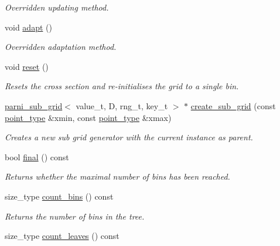 \begin{DoxyCompactItemize}
\begin{DoxyCompactList}\small\item\em Overridden updating method. \end{DoxyCompactList}\item 
\hypertarget{a00395_a569621866d7d53e00a1586d12d7200c8}{}void \hyperlink{a00395_a569621866d7d53e00a1586d12d7200c8}{adapt} ()\label{a00395_a569621866d7d53e00a1586d12d7200c8}

\begin{DoxyCompactList}\small\item\em Overridden adaptation method. \end{DoxyCompactList}\item 
void \hyperlink{a00395_a1ba9757b4e125032dd1dc836fec4c4fb}{reset} ()
\begin{DoxyCompactList}\small\item\em Resets the cross section and re-\/initialises the grid to a single bin. \end{DoxyCompactList}\item 
\hypertarget{a00395_af614bf3d946c45465e2d70e2ece2b8e0}{}\hyperlink{a00397}{parni\+\_\+sub\+\_\+grid}$<$ value\+\_\+t, D, rng\+\_\+t, key\+\_\+t $>$ $\ast$ \hyperlink{a00395_af614bf3d946c45465e2d70e2ece2b8e0}{create\+\_\+sub\+\_\+grid} (const \hyperlink{a00579}{point\+\_\+type} \&xmin, const \hyperlink{a00579}{point\+\_\+type} \&xmax)\label{a00395_af614bf3d946c45465e2d70e2ece2b8e0}

\begin{DoxyCompactList}\small\item\em Creates a new sub grid generator with the current instance as parent. \end{DoxyCompactList}\item 
\hypertarget{a00395_ac278e12caf66add9a1538210068c0992}{}bool \hyperlink{a00395_ac278e12caf66add9a1538210068c0992}{final} () const \label{a00395_ac278e12caf66add9a1538210068c0992}

\begin{DoxyCompactList}\small\item\em Returns whether the maximal number of bins has been reached. \end{DoxyCompactList}\item 
\hypertarget{a00395_a4e6418b280bdef02232b116365beb0e9}{}size\+\_\+type \hyperlink{a00395_a4e6418b280bdef02232b116365beb0e9}{count\+\_\+bins} () const \label{a00395_a4e6418b280bdef02232b116365beb0e9}

\begin{DoxyCompactList}\small\item\em Returns the number of bins in the tree. \end{DoxyCompactList}\item 
\hypertarget{a00395_aa571715ea2e83a3d1c760d431c0b8fe6}{}size\+\_\+type \hyperlink{a00395_aa571715ea2e83a3d1c760d431c0b8fe6}{count\+\_\+leaves} () const \label{a00395_aa571715ea2e83a3d1c760d431c0b8fe6}


\end{DoxyCompactItemize}
